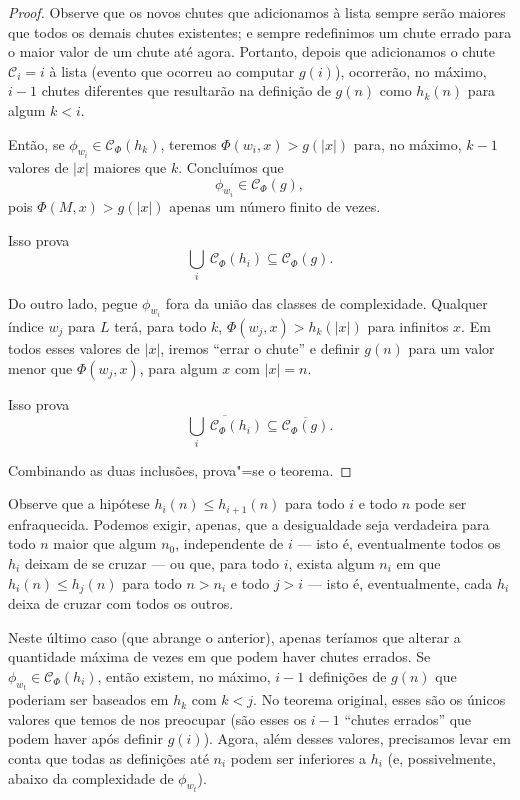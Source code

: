 \begin{proof}
    Observe que os novos chutes que adicionamos à lista
    sempre serão maiores que todos os demais chutes existentes;
    e sempre redefinimos um chute errado
    para o maior valor de um chute até agora.
    Portanto, depois que adicionamos o chute
    $\mathcal C_i = i$ à lista
    (evento que ocorreu ao computar $g(i)$),
    ocorrerão, no máximo,
    $i-1$ chutes diferentes
    que resultarão na definição de $g(n)$ como $h_k(n)$
    para algum $k < i$.

    Então, se $\phi_{w_i} \in \mathcal C_\Phi(h_k)$,
    teremos $\Phi(w_i, x) > g(|x|)$
    para, no máximo, $k-1$ valores de $|x|$ maiores que $k$.
    Concluímos que
    \begin{equation*}
        \phi_{w_i} \in \mathcal C_\Phi(g),
    \end{equation*}
    pois $\Phi(M, x) > g(|x|)$ apenas um número finito de vezes.

    Isso prova
    \begin{equation*}
        \bigcup_i \ \mathcal C_\Phi(h_i) \subseteq \mathcal C_\Phi(g).
    \end{equation*}

    Do outro lado,
    pegue $\phi_{w_i}$ fora da união das classes de complexidade.
    Qualquer índice $w_j$ para $L$
    terá, para todo $k$,
    $\Phi(w_j, x) > h_k(|x|)$ para infinitos $x$.
    Em todos esses valores de $|x|$,
    iremos ``errar o chute''
    e definir $g(n)$
    para um valor menor que $\Phi(w_j, x)$,
    para algum $x$ com $|x| = n$.

    Isso prova
    \begin{equation*}
        \overline{\bigcup_i \ \mathcal C_\Phi(h_i)}
        \subseteq \overline{\mathcal C_\Phi(g)}.
    \end{equation*}

    Combinando as duas inclusões, prova"=se o teorema.
\end{proof}

Observe que a hipótese $h_i(n) \leq h_{i+1}(n)$
para todo $i$ e todo $n$
pode ser enfraquecida.
Podemos exigir, apenas,
que a desigualdade seja verdadeira para todo $n$
maior que algum $n_0$,
independente de $i$
--- isto é, eventualmente todos os $h_i$
deixam de se cruzar
---
ou que, para todo $i$,
exista algum $n_i$ em que
$h_i(n) \leq h_j(n)$ para todo $n > n_i$
e todo $j > i$
--- isto é, eventualmente,
cada $h_i$ deixa de cruzar com todos os outros.

Neste último caso
(que abrange o anterior),
apenas teríamos que alterar a quantidade máxima de vezes
em que podem haver chutes errados.
Se $\phi_{w_t} \in \mathcal C_\Phi(h_i)$,
então existem, no máximo,
$i - 1$ definições de $g(n)$
que poderiam ser baseados em $h_k$
com $k < j$.
No teorema original,
esses são os únicos valores que temos de nos preocupar
(são esses os $i-1$ ``chutes errados'' que podem haver
após definir $g(i)$).
Agora, além desses valores,
precisamos levar em conta que
todas as definições até $n_i$
podem ser inferiores a $h_i$
(e, possivelmente, abaixo da complexidade de $\phi_{w_t}$).

